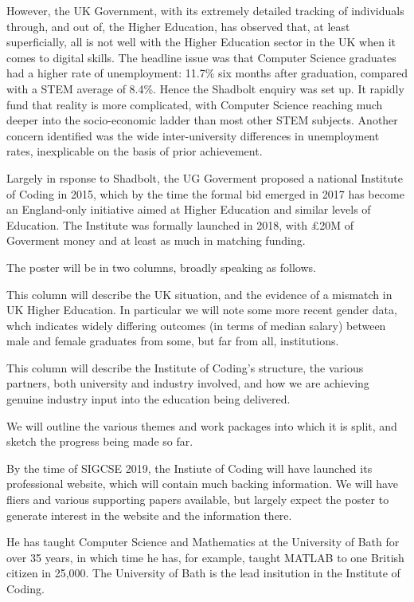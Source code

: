 \documentclass[11pt]{article} %
\begin{document}
However, the UK Government, with its extremely detailed tracking of individuals through, and out of, the Higher Education, has observed that, at least superficially, all is not well with the Higher Education sector in the UK when it comes to digital skills. The headline issue was that Computer Science graduates had a higher rate of unemployment: 11.7\%  six months after graduation, compared with a STEM average of 8.4\%. Hence the Shadbolt enquiry was set up. It rapidly fund that reality is more complicated, with Computer Science reaching much deeper into the socio-economic ladder than most other STEM subjects.  Another concern identified was the wide inter-university differences in unemployment rates, inexplicable on the basis of prior achievement.

Largely in rsponse to Shadbolt, the UG Goverment proposed a national Institute of Coding in 2015, which by the time the formal bid emerged in 2017 has become an England-only initiative aimed at Higher Education and similar levels of Education.  The Institute was formally launched in 2018, with \pounds20M of Goverment money and at least as much in matching funding.

\medskip
{}\noindent
The poster will be in two columns, broadly speaking as follows.


\medskip
{}\noindent
This column will describe the UK situation, and the evidence of a mismatch in UK Higher Education.  In particular we will note some more recent gender data, whch indicates widely differing outcomes (in terms of median salary) between male and female graduates from some, but far from all, institutions.


\medskip
{}\noindent
This column will describe the Institute of Coding's structure, the various partners, both university and industry involved, and how we are achieving genuine industry input into the education being delivered.

We will outline the various themes and work packages into which it is split, and sketch the progress being made so far.

\medskip
{}\noindent
By the time of SIGCSE 2019, the Instiute of Coding will have launched its professional website, which will contain much backing information. We will have fliers and various supporting papers available, but largely expect the poster to generate interest in the website and the information there.

\noindent
He has taught Computer Science and Mathematics at the University of Bath for over 35 years, in which time he has, for example, taught MATLAB to one British citizen in 25,000. The University of Bath is the lead insitution in the Institute of Coding.
\end{document}
